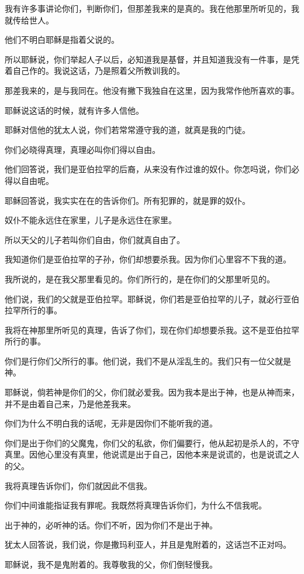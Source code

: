 \documentclass[12pt,oneside]{book}
\begin{document}
我有许多事讲论你们，判断你们，但那差我来的是真的。我在他那里所听见的，我就传给世人。

他们不明白耶稣是指着父说的。

所以耶稣说，你们举起人子以后，必知道我是基督，并且知道我没有一件事，是凭着自己作的。我说这话，乃是照着父所教训我的。

那差我来的，是与我同在。他没有撇下我独自在这里，因为我常作他所喜欢的事。

耶稣说这话的时候，就有许多人信他。

耶稣对信他的犹太人说，你们若常常遵守我的道，就真是我的门徒。

你们必晓得真理，真理必叫你们得以自由。

他们回答说，我们是亚伯拉罕的后裔，从来没有作过谁的奴仆。你怎吗说，你们必得以自由呢。

耶稣回答说，我实实在在的告诉你们。所有犯罪的，就是罪的奴仆。

奴仆不能永远住在家里，儿子是永远住在家里。

所以天父的儿子若叫你们自由，你们就真自由了。

我知道你们是亚伯拉罕的子孙，你们却想要杀我。因为你们心里容不下我的道。

我所说的，是在我父那里看见的。你们所行的，是在你们的父那里听见的。

他们说，我们的父就是亚伯拉罕。耶稣说，你们若是亚伯拉罕的儿子，就必行亚伯拉罕所行的事。

我将在神那里所听见的真理，告诉了你们，现在你们却想要杀我。这不是亚伯拉罕所行的事。

你们是行你们父所行的事。他们说，我们不是从淫乱生的。我们只有一位父就是神。

耶稣说，倘若神是你们的父，你们就必爱我。因为我本是出于神，也是从神而来，并不是由着自己来，乃是他差我来。

你们为什么不明白我的话呢，无非是因你们不能听我的道。

你们是出于你们的父魔鬼，你们父的私欲，你们偏要行，他从起初是杀人的，不守真里。因他心里没有真里，他说谎是出于自己，因他本来是说谎的，也是说谎之人的父。

我将真理告诉你们，你们就因此不信我。

你们中间谁能指证我有罪呢。我既然将真理告诉你们，为什么不信我呢。

出于神的，必听神的话。你们不听，因为你们不是出于神。

犹太人回答说，我们说，你是撒玛利亚人，并且是鬼附着的，这话岂不正对吗。

耶稣说，我不是鬼附着的。我尊敬我的父，你们倒轻慢我。
\end{document}
